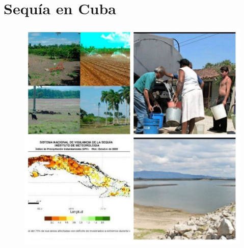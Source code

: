 \documentclass[12pt]{article}
\begin{document}
	\section{Sequía en Cuba}
    \begin{figure}
		\centering
		\includegraphics[width=0.7\linewidth]{./Report/images/9.jpg}
	\end{figure}
\end{document}
